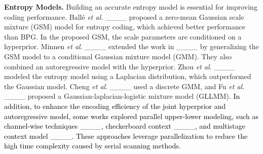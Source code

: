 \textbf{Entropy Models.} Building an accurate entropy model is essential for improving coding performance. Ballé \textit{et al}. ____ proposed a zero-mean Gaussian scale mixture (GSM) model for entropy coding, which achieved better performance than BPG. In the proposed GSM, the scale parameters are conditioned on a hyperprior. 
Minnen \textit{et al}. ____ extended the work in ____ by generalizing the GSM model to a conditional Gaussian mixture model (GMM). They also combined an autoregressive model with the hyperprior. Zhou \textit{et al}. ____ modeled the entropy model using a Laplacian distribution, which outperformed the Gaussian model. Cheng \textit{et al}. ____ used a discrete GMM, and Fu \textit{et al}. ____ proposed a Gaussian-laplacian-logistic mixture model (GLLMM). \textcolor{black}{In addition, to enhance the encoding efficiency of the joint hyperprior and autoregressive model, some works explored parallel upper-lower modeling, such as channel-wise techniques ____, checkerboard context ____, and multistage context model ____. These approaches leverage parallelization to reduce the high time complexity caused by serial scanning methods.}
